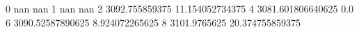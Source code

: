 0 nan nan
1 nan nan
2 3092.755859375 11.154052734375
4 3081.601806640625 0.0
6 3090.52587890625 8.924072265625
8 3101.9765625 20.374755859375
